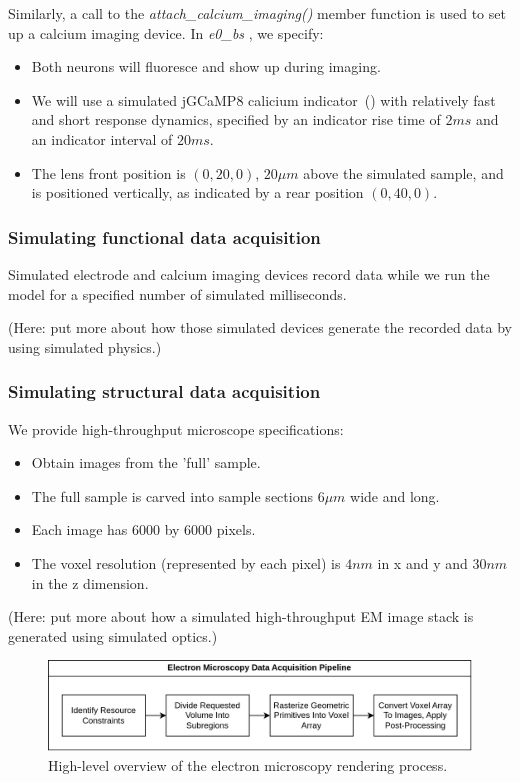 \documentclass{ldr-article}
\def\firstexp{\textit{e0\_bs} }
\begin{document}
Similarly, a call to the \textit{attach\_calcium\_imaging()} member function is used to set up a calcium imaging device. In \firstexp, we specify:
\begin{itemize}
	\item Both neurons will fluoresce and show up during imaging.
	\item We will use a simulated jGCaMP8 calicium indicator~(\cite{zhang2023}) with relatively fast and short response dynamics, specified by an indicator rise time of $2 ms$ and an indicator interval of $20 ms$.
	\item The lens front position is $(0, 20, 0)$, $20 \mu m$ above the simulated sample, and is positioned vertically, as indicated by a rear position $(0, 40, 0)$.
\end{itemize}

\subsubsection{Simulating functional data acquisition}

Simulated electrode and calcium imaging devices record data while we run the model for a specified number of simulated milliseconds.

(Here: put more about how those simulated devices generate the recorded data by using simulated physics.)


\subsubsection{Simulating structural data acquisition}

We provide high-throughput microscope specifications:
\begin{itemize}
	\item Obtain images from the 'full' sample.
	\item The full sample is carved into sample sections $6 \mu m$ wide and long.
	\item Each image has $6000$ by $6000$ pixels.
	\item The voxel resolution (represented by each pixel) is $4 nm$ in x and y and $30 nm$ in the z dimension.
\end{itemize}

(Here: put more about how a simulated high-throughput EM image stack is generated using simulated optics.)

\begin{figure}
    \centering
    \includegraphics[width=1\linewidth]{Figures/VBP_EM_Render_Pipeline.drawio.png}
    \caption{High-level overview of the electron microscopy rendering process.}
    \label{fig:em-pipeline}
\end{figure}
\end{document}
